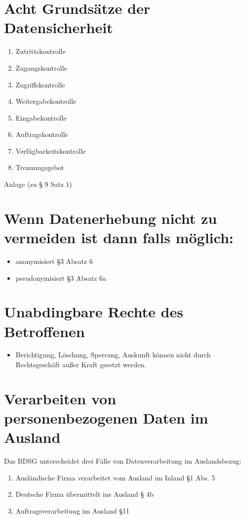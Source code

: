 \documentclass[a4paper,10pt]{scrartcl}
\begin{document}
\section{Acht Grundsätze der Datensicherheit}
\begin{enumerate}
 \item Zutrittskontrolle
 \item Zugangskontrolle
 \item Zugriffskontrolle
 \item Weitergabekontrolle
 \item Eingabekontrolle
 \item Auftragskontrolle
 \item Verfügbarkeitskontrolle
 \item Trennungsgebot
\end{enumerate}
Anlage (zu § 9 Satz 1)

\section{Wenn Datenerhebung nicht zu vermeiden ist dann falls möglich:}
\begin{itemize}
 \item anonymisiert §3 Absatz 6
 \item pseudonymisiert §3 Absatz 6a
\end{itemize}

\section{ Unabdingbare Rechte des Betroffenen}
\begin{itemize}
 \item Berichtigung, Löschung, Sperrung, Auskunft können nicht
 durch Rechtsgeschäft außer Kraft gesetzt werden.
\end{itemize}

\section{ Verarbeiten von personenbezogenen Daten im Ausland}

Das BDSG unterscheidet drei Fälle von Datenverarbeitung im Auslandsbezug:
\begin{enumerate}
 \item Ausländische Firma verarbeitet vom Ausland im Inland §1 Abs. 5
 \item Deutsche Firma übermittelt ins Ausland § 4b
 \item Auftragsverarbeitung im Ausland §11
\end{enumerate}
\end{document}
